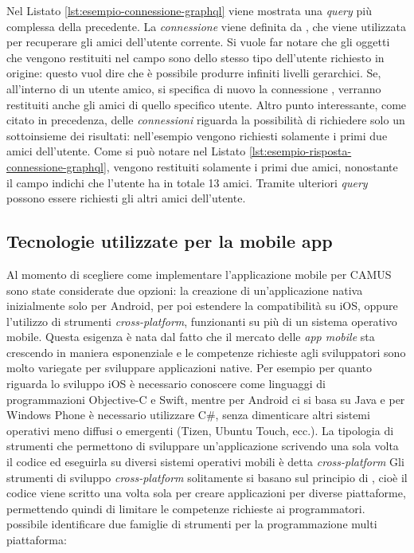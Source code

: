 Nel Listato \ref{lst:esempio-connessione-graphql} viene mostrata una \emph{query} più complessa della precedente. La \emph{connessione} viene definita da , che viene utilizzata per recuperare gli amici dell'utente corrente. Si vuole far notare che gli oggetti che vengono restituiti nel campo  sono dello stesso tipo dell'utente richiesto in origine: questo vuol dire che è possibile produrre infiniti livelli gerarchici. Se, all'interno di un utente amico, si specifica di nuovo la connessione , verranno restituiti anche gli amici di quello specifico utente. Altro punto interessante, come citato in precedenza, delle \emph{connessioni} riguarda la possibilità di richiedere solo un sottoinsieme dei risultati: nell'esempio vengono richiesti solamente i primi due amici dell'utente. Come si può notare nel Listato \ref{lst:esempio-risposta-connessione-graphql}, vengono restituiti solamente i primi due amici, nonostante il campo  indichi che l'utente ha in totale 13 amici. Tramite ulteriori \emph{query} possono essere richiesti gli altri amici dell'utente.

\subsection{Tecnologie utilizzate per la mobile app}\label{sec:panoramica-cross-platform-mobile}

Al momento di scegliere come implementare l'applicazione mobile per CAMUS sono state considerate due opzioni: la creazione di un'applicazione nativa inizialmente solo per Android, per poi estendere la compatibilità su iOS, oppure l'utilizzo di strumenti \emph{cross-platform}, funzionanti su più di un sistema operativo mobile.
Questa esigenza è nata dal fatto che il mercato delle \emph{app mobile} sta crescendo in maniera esponenziale e le competenze richieste agli sviluppatori sono molto variegate per sviluppare applicazioni native.
Per esempio per quanto riguarda lo sviluppo iOS è necessario conoscere come linguaggi di programmazioni Objective-C e Swift, mentre per Android ci si basa su Java e per Windows Phone è necessario utilizzare C\#, senza dimenticare altri sistemi operativi meno diffusi o emergenti (Tizen, Ubuntu Touch, ecc.). La tipologia di strumenti che permettono di sviluppare un'applicazione scrivendo una sola volta il codice ed eseguirla su diversi sistemi operativi mobili è detta \emph{cross-platform}
Gli strumenti di sviluppo \emph{cross-platform} solitamente si basano sul principio di , cioè il codice viene scritto una volta sola per creare applicazioni per diverse piattaforme, permettendo quindi di limitare le competenze richieste ai programmatori. 
\upe possibile identificare due famiglie di strumenti per la programmazione multi piattaforma:


